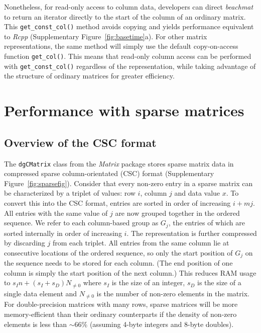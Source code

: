\documentclass{article}
\newcommand{\beachmat}{\textit{beachmat}}
\newcommand{\code}[1]{\texttt{#1}}
\begin{document}
Nonetheless, for read-only access to column data, developers can direct \beachmat{} to return an iterator directly to the start of the column of an ordinary matrix.
This \code{get\_const\_col()} method avoids copying and yields performance equivalent to \textit{Rcpp} (Supplementary Figure~\ref{fig:basetime}a).
For other matrix representations, the same method will simply use the default copy-on-access function \code{get\_col()}.
This means that read-only column access can be performed with \code{get\_const\_col()} regardless of the representation, while taking advantage of the structure of ordinary matrices for greater efficiency.

\section{Performance with sparse matrices}

\subsection{Overview of the CSC format}
The \code{dgCMatrix} class from the \textit{Matrix} package stores sparse matrix data in compressed sparse column-orientated (CSC) format (Supplementary Figure~\ref{fig:sparsefig}).
Consider that every non-zero entry in a sparse matrix can be characterized by a triplet of values: row $i$, column $j$ and data value $x$.
To convert this into the CSC format, entries are sorted in order of increasing $i + mj$.
All entries with the same value of $j$ are now grouped together in the ordered sequence.
We refer to each column-based group as $G_j$, the entries of which are sorted internally in order of increasing $i$.
The representation is further compressed by discarding $j$ from each triplet.
All entries from the same column lie at consecutive locations of the ordered sequence, so only the start position of $G_j$ on the sequence needs to be stored for each column.
(The end position of one column is simply the start position of the next column.)
This reduces RAM usage to $s_In + (s_I + s_D) N_{\ne 0}$ where $s_I$ is the size of an integer, $s_D$ is the size of a single data element and $N_{\ne 0}$ is the number of non-zero elements in the matrix.
For double-precision matrices with many rows, sparse matrices will be more memory-efficient than their ordinary counterparts if the density of non-zero elements is less than $\sim 66$\% (assuming 4-byte integers and 8-byte doubles). 

\end{document}
